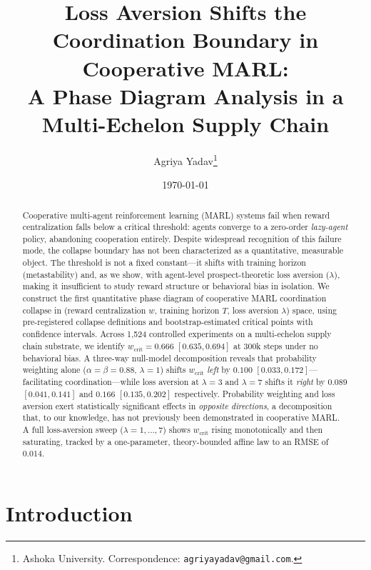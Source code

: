 \documentclass[11pt]{article}
\title{\textbf{Loss Aversion Shifts the Coordination Boundary in Cooperative MARL:\\
A Phase Diagram Analysis in a Multi-Echelon Supply Chain}}
\author{
Agriya Yadav\thanks{Ashoka University. Correspondence: \texttt{agriyayadav@gmail.com}.} \\
}
\date{\today}
\newcommand{\wcrit}{w_{\mathrm{crit}}}
\begin{document}
\maketitle

\begin{abstract}
Cooperative multi-agent reinforcement learning (MARL) systems fail when
reward centralization falls below a critical threshold: agents converge to
a zero-order \emph{lazy-agent} policy, abandoning cooperation entirely.
Despite widespread recognition of this failure mode, the collapse boundary
has not been characterized as a quantitative, measurable object.
The threshold is not a fixed constant---it shifts with training horizon
(metastability) and, as we show, with agent-level prospect-theoretic loss
aversion ($\lambda$), making it insufficient to study reward structure or
behavioral bias in isolation.
We construct the first quantitative phase diagram of cooperative MARL
coordination collapse in (reward centralization $w$, training horizon $T$,
loss aversion $\lambda$) space, using pre-registered collapse definitions
and bootstrap-estimated critical points with confidence intervals.
Across 1,524 controlled experiments on a multi-echelon supply chain
substrate, we identify $\wcrit = 0.666$ $[0.635, 0.694]$ at 300k steps
under no behavioral bias.
A three-way null-model decomposition reveals that probability weighting
alone ($\alpha{=}\beta{=}0.88$, $\lambda{=}1$) shifts $\wcrit$ \emph{left}
by $0.100$ $[0.033, 0.172]$---facilitating coordination---while loss
aversion at $\lambda{=}3$ and $\lambda{=}7$ shifts it \emph{right} by
$0.089$ $[0.041, 0.141]$ and $0.166$ $[0.135, 0.202]$ respectively.
Probability weighting and loss aversion exert statistically significant
effects in \emph{opposite directions}, a decomposition that, to our
knowledge, has not previously been demonstrated in cooperative MARL.
A full loss-aversion sweep ($\lambda = 1,\ldots,7$) shows $\wcrit$ rising
monotonically and then saturating, tracked by a one-parameter,
theory-bounded affine law to an RMSE of $0.014$.
\end{abstract}

\section{Introduction}
\label{sec:intro}
\end{document}
